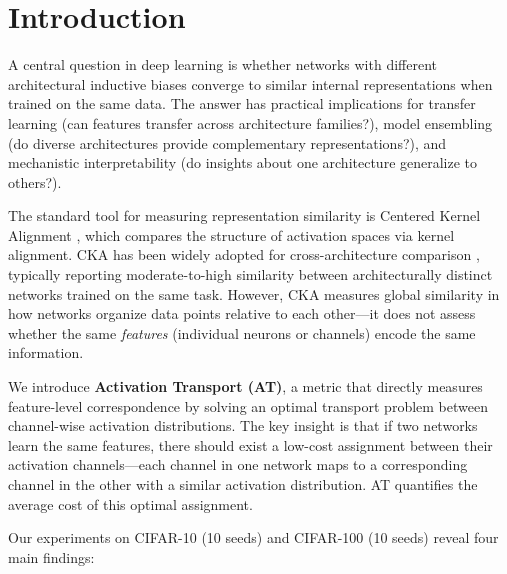 \documentclass{article}
\begin{document}
\section{Introduction}
\label{sec:introduction}

A central question in deep learning is whether networks with different architectural inductive biases converge to similar internal representations when trained on the same data. The answer has practical implications for transfer learning (can features transfer across architecture families?), model ensembling (do diverse architectures provide complementary representations?), and mechanistic interpretability (do insights about one architecture generalize to others?).

The standard tool for measuring representation similarity is Centered Kernel Alignment \citep[CKA;][]{kornblith2019similarity}, which compares the structure of activation spaces via kernel alignment. CKA has been widely adopted for cross-architecture comparison \citep{raghu2021vision,nguyen2021wide}, typically reporting moderate-to-high similarity between architecturally distinct networks trained on the same task. However, CKA measures global similarity in how networks organize data points relative to each other---it does not assess whether the same \emph{features} (individual neurons or channels) encode the same information.

We introduce \textbf{Activation Transport (AT)}, a metric that directly measures feature-level correspondence by solving an optimal transport problem between channel-wise activation distributions. The key insight is that if two networks learn the same features, there should exist a low-cost assignment between their activation channels---each channel in one network maps to a corresponding channel in the other with a similar activation distribution. AT quantifies the average cost of this optimal assignment.

Our experiments on CIFAR-10 (10 seeds) and CIFAR-100 (10 seeds) reveal four main findings:
\end{document}
